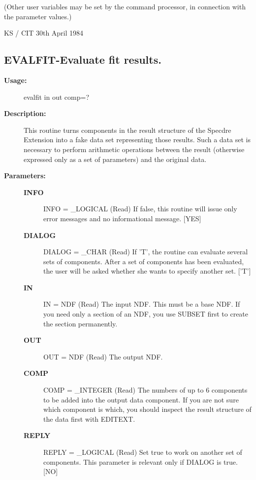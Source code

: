 \begin{description}
\begin{description}
\begin{terminalv}
 (Other user variables may be set by the command processor, in
 connection with the parameter values.)

                                     KS / CIT  30th April 1984
\end{terminalv}
\end{description}
\subsection{EVALFIT-\label{EVALFIT}Evaluate fit results.}
\begin{description}

\item [\textbf{Usage:}]

   evalfit in out comp=?


\item [\textbf{Description:}]
   This routine turns components in the result structure of the
   Specdre Extension into a fake data set representing those results.
   Such a data set is necessary to perform arithmetic operations
   between the result (otherwise expressed only as a set of
   parameters) and the original data.


\item [\textbf{Parameters:}]
\begin{description}
\item [\textbf{INFO}]
INFO = \_LOGICAL (Read)
   If false, this routine will issue only error messages and no
   informational message. [YES]
\item [\textbf{DIALOG}]
DIALOG = \_CHAR (Read)
   If 'T', the routine can evaluate several sets of components.
   After a set of components has been evaluated, the user will be
   asked whether she wants to specify another set. ['T']
\item [\textbf{IN}]
IN = NDF (Read)
   The input NDF. This must be a base NDF. If you need only a
   section of an NDF, you use SUBSET first to create the section
   permanently.
\item [\textbf{OUT}]
OUT = NDF (Read)
   The output NDF.
\item [\textbf{COMP}]
COMP = \_INTEGER (Read)
   The numbers of up to 6 components to be added into the output
   data component. If you are not sure which component is which,
   you should inspect the result structure of the data first with
   EDITEXT.
\item [\textbf{REPLY}]
REPLY = \_LOGICAL (Read)
   Set true to work on another set of components. This parameter
   is relevant only if DIALOG is true.
   [NO]
\end{description}


\end{description}
\end{description}

